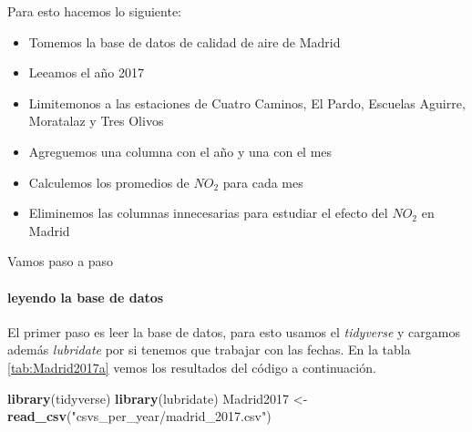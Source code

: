 \documentclass[]{book}
\newenvironment{Shaded}{\begin{snugshade}}{\end{snugshade}}
\newcommand{\KeywordTok}[1]{\textcolor[rgb]{0.13,0.29,0.53}{\textbf{#1}}}
\newcommand{\NormalTok}[1]{#1}
\newcommand{\StringTok}[1]{\textcolor[rgb]{0.31,0.60,0.02}{#1}}
\providecommand{\tightlist}{%
  \setlength{\itemsep}{0pt}\setlength{\parskip}{0pt}}
\let\oldparagraph\paragraph
\renewcommand{\paragraph}[1]{\oldparagraph{#1}\mbox{}}
\begin{document}
Para esto hacemos lo siguiente:

\begin{itemize}
\tightlist
\item
  Tomemos la base de datos de calidad de aire de Madrid
\item
  Leeamos el año 2017
\item
  Limitemonos a las estaciones de Cuatro Caminos, El Pardo, Escuelas
  Aguirre, Moratalaz y Tres Olivos
\item
  Agreguemos una columna con el año y una con el mes
\item
  Calculemos los promedios de \(NO_2\) para cada mes
\item
  Eliminemos las columnas innecesarias para estudiar el efecto del
  \(NO_2\) en Madrid
\end{itemize}

Vamos paso a paso

\hypertarget{leyendo-la-base-de-datos}{%
\paragraph{leyendo la base de datos}\label{leyendo-la-base-de-datos}}

El primer paso es leer la base de datos, para esto usamos el
\emph{tidyverse} y cargamos además \emph{lubridate} por si tenemos que
trabajar con las fechas. En la tabla \ref{tab:Madrid2017a} vemos los
resultados del código a continuación.

\begin{Shaded}
\begin{Highlighting}[]
\KeywordTok{library}\NormalTok{(tidyverse)}
\KeywordTok{library}\NormalTok{(lubridate)}
\NormalTok{Madrid2017 <-}\StringTok{ }\KeywordTok{read_csv}\NormalTok{(}\StringTok{"csvs_per_year/madrid_2017.csv"}\NormalTok{)}
\end{Highlighting}
\end{Shaded}
\end{document}
